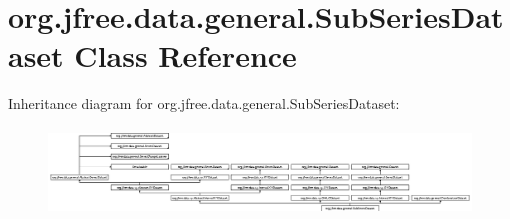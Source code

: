 \hypertarget{classorg_1_1jfree_1_1data_1_1general_1_1_sub_series_dataset}{}\section{org.\+jfree.\+data.\+general.\+Sub\+Series\+Dataset Class Reference}
\label{classorg_1_1jfree_1_1data_1_1general_1_1_sub_series_dataset}
Inheritance diagram for org.\+jfree.\+data.\+general.\+Sub\+Series\+Dataset\+:\begin{figure}[H]
\begin{center}
\leavevmode
\includegraphics[height=2.344322cm]{classorg_1_1jfree_1_1data_1_1general_1_1_sub_series_dataset}
\end{center}
\end{figure}
